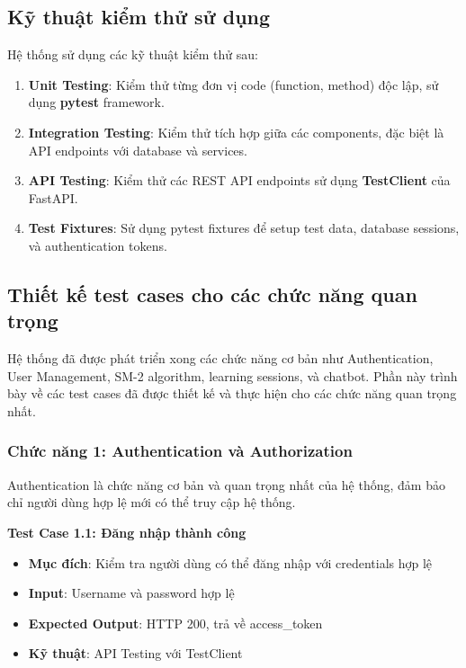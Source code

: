 \documentclass[../DoAn.tex]{subfiles}
\begin{document}
\subsection{Kỹ thuật kiểm thử sử dụng}

Hệ thống sử dụng các kỹ thuật kiểm thử sau:

\begin{enumerate}
    \item \textbf{Unit Testing}: Kiểm thử từng đơn vị code (function, method) độc lập, sử dụng \textbf{pytest} framework.
    
    \item \textbf{Integration Testing}: Kiểm thử tích hợp giữa các components, đặc biệt là API endpoints với database và services.
    
    \item \textbf{API Testing}: Kiểm thử các REST API endpoints sử dụng \textbf{TestClient} của FastAPI.
    
    \item \textbf{Test Fixtures}: Sử dụng pytest fixtures để setup test data, database sessions, và authentication tokens.
\end{enumerate}

\subsection{Thiết kế test cases cho các chức năng quan trọng}

Hệ thống đã được phát triển xong các chức năng cơ bản như Authentication, User Management, SM-2 algorithm, learning sessions, và chatbot. Phần này trình bày về các test cases đã được thiết kế và thực hiện cho các chức năng quan trọng nhất.

\subsubsection{Chức năng 1: Authentication và Authorization}

Authentication là chức năng cơ bản và quan trọng nhất của hệ thống, đảm bảo chỉ người dùng hợp lệ mới có thể truy cập hệ thống.

\textbf{Test Case 1.1: Đăng nhập thành công}
\begin{itemize}
    \item \textbf{Mục đích}: Kiểm tra người dùng có thể đăng nhập với credentials hợp lệ
    \item \textbf{Input}: Username và password hợp lệ
    \item \textbf{Expected Output}: HTTP 200, trả về access\_token
    \item \textbf{Kỹ thuật}: API Testing với TestClient
\end{itemize}
\end{document}
